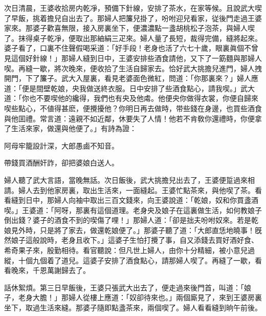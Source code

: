 次日清晨，王婆收拾房内乾凈，預備下針線，安排了茶水，在家等候。且說武大喫了早飯，挑着擔兒自出去了。那婦人把簾兒掛了，吩咐迎兒看家，従後門走過王婆家來。那婆子歡喜無限，接入房裏坐下，便濃濃點一盞胡桃松子泡茶，與婦人喫了。抹得桌子乾凈，便取出那紬絹三疋來。婦人量了長短，裁得完備，縫將起來。婆子看了，口裏不住聲假喝采道：「好手段！老身也活了六七十歲，眼裏眞個不曾見這個好針線！」那婦人縫到日中，王婆安排些酒食請他，又下了一筯麵與那婦人喫。再縫一歇，將次晚來，便收拾了生活自歸家去。恰好武大挑擔兒進門，婦人拽開門，下了簾子。武大入屋裏，看見老婆面色微紅，問道：「你那裏來？」婦人應道：「便是間壁乾娘，央我做送終衣服。日中安排了些酒食點心，請我喫。」武大道：「你也不要喫他的纔得，我們也有央及他䖏。他便央你做得衣裳，你便自歸來喫些點心，不値得甚麽，便攪擾他？你明日再去做時，带些錢在身邊，也買些酒食與他囬禮。常言道：遠親不如近鄰，休要失了人情！他若不肯敎你還禮時，你便拿了生活來家，做還與他便了。」有詩為證：

\begin{myquote}
阿母牢籠設計深，大郎愚鹵不知音。

帶錢買酒酬奸詐，卻把婆娘白送人。
\end{myquote}

婦人聽了武大言語，當晚無話。次日飯後，武大挑擔兒出去了，王婆便踅過來相請。婦人去到他家房裏，取出生活來，一面縫起。王婆忙點茶來，與他喫了茶。看看縫到日中，那婦人向袖中取出三百文錢來，向王婆說道：「乾娘，奴和你買盞酒喫。」王婆道：「阿呀，那裏有這個道理。老身央及娘子在這裏做生活，如何教娘子倒出錢？婆子的酒食不到的喫傷了哩！」那婦人道：「卻是拙夫吩咐奴來。若是乾娘見外時，只是將了家去，做還乾娘便了。」那婆子聽了道：「大郎直恁地曉事！旣然娘子這般說時，老身且收下。」這婆子生怕打攪了事，自又添錢去買好酒好食、希奇果子來，殷勤相待。看官聽說：但凡世上婦人，由你十分精細，被小意兒過縱，十個九個着了道兒。這婆子安排了酒食點心，請那婦人喫了。再縫了一歇，看看晚來，千恩萬謝歸去了。

話休絮煩。第三日早飯後，王婆只張武大出去了，便走過來後門首，叫道：「娘子，老身大膽！」那婦人從樓上應道：「奴卻待來也。」兩個廝見了，來到王婆房裏坐下，取過生活來縫。那婆子隨即點盞茶來，兩個喫了。婦人看看縫到晌午前後。

